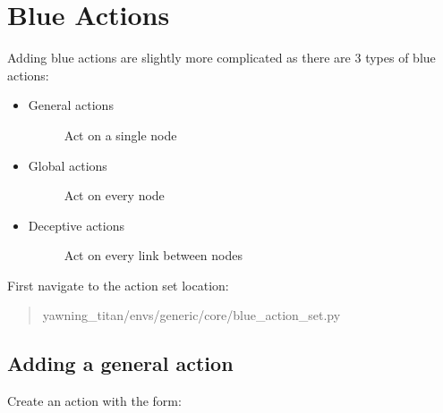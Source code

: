 \documentclass[letterpaper,10pt,english]{sphinxmanual}
\begin{document}
\section{Blue Actions}
\label{\detokenize{source/enhancing_yawning_titan:blue-actions}}
\sphinxAtStartPar
Adding blue actions are slightly more complicated as there are 3 types
of blue actions:
\begin{itemize}
\item {} \begin{description}
\item[{General actions}] \leavevmode
\sphinxAtStartPar
Act on a single node

\end{description}

\item {} \begin{description}
\item[{Global actions}] \leavevmode
\sphinxAtStartPar
Act on every node

\end{description}

\item {} \begin{description}
\item[{Deceptive actions}] \leavevmode
\sphinxAtStartPar
Act on every link between nodes

\end{description}

\end{itemize}

\sphinxAtStartPar
First navigate to the action set location:
\begin{quote}

\sphinxAtStartPar
yawning\_titan/envs/generic/core/blue\_action\_set.py
\end{quote}


\subsection{Adding a general action}
\label{\detokenize{source/enhancing_yawning_titan:adding-a-general-action}}
\sphinxAtStartPar
Create an action with the form:

\begin{sphinxVerbatim}[commandchars=\\\{\}]
     \PYG{p}{[} \PYG{p}{]}
\end{sphinxVerbatim}
\end{document}
